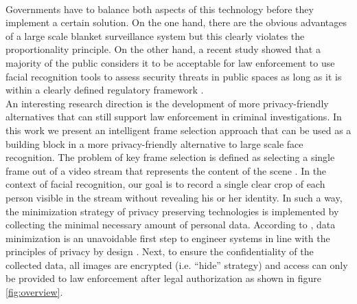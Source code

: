 \documentclass[letterpaper]{article} %
\begin{document}
\\
\newline
Governments have to balance both aspects of this technology before they implement a certain solution. On the one hand, there are the obvious advantages of a large scale blanket surveillance system but this clearly violates the proportionality principle. On the other hand, a recent study showed that a majority of the public considers it to be acceptable for law enforcement to use facial recognition tools to assess security threats in public spaces as long as it is within a clearly defined regulatory framework \cite{smith2019more}.
\\
An interesting research direction is the development of more privacy-friendly alternatives that can still support law enforcement in criminal investigations. In this work we present an intelligent frame selection approach that can be used as a building block in a more privacy-friendly alternative to large scale face recognition. The problem of key frame selection is defined as selecting a single frame out of a video stream that represents the content of the scene \cite{wolf1996key}. In the context of facial recognition, our goal is to record a single clear crop of each person visible in the stream without revealing his or her identity. In such a way, the minimization strategy of privacy preserving technologies \cite{DomingoFerrer2020} is implemented by collecting the minimal necessary amount of personal data.
According to \cite{duncan2007engineering}, data minimization is an unavoidable first step to engineer systems in line with the principles of privacy by design \cite{cavoukian2009privacy}. Next, to ensure the confidentiality of the collected data, all images are encrypted (i.e. ``hide'' strategy) and access can only be provided to law enforcement after legal authorization as shown in figure \ref{fig:overview}.
\\
\newline
\end{document}
